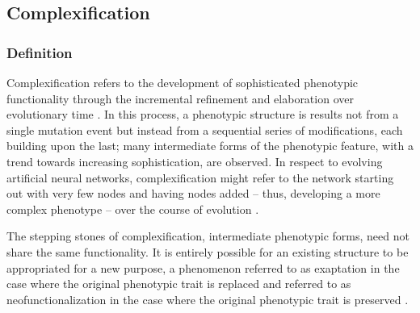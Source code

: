    
\subsection{Complexification} \label{sec:complexification}
\subsubsection{Definition}
Complexification refers to the development of sophisticated phenotypic functionality through the incremental refinement and elaboration over evolutionary time \cite[pg 202]{Downing2015IntelligenceSystems}. In this process, a phenotypic structure is results not from a single mutation event but instead from a sequential series of modifications, each building upon the last; many intermediate forms of the phenotypic feature, with a trend towards increasing sophistication, are observed. In respect to evolving artificial neural networks, complexification might refer to the network starting out with very few nodes and having nodes added -- thus, developing a more complex phenotype --  over the course of evolution \cite{Clune2011OnRegularity}.

The stepping stones of complexification, intermediate phenotypic forms, need not share the same functionality. It is entirely possible for an existing structure to be appropriated for a new purpose, a phenomenon referred to as exaptation \cite{Gould1982Exaptation-aForm} in the case where the original phenotypic trait is replaced and referred to as neofunctionalization in the case where the original phenotypic trait is preserved \cite{Escriva2006NeofunctionalizationReceptors}.  

